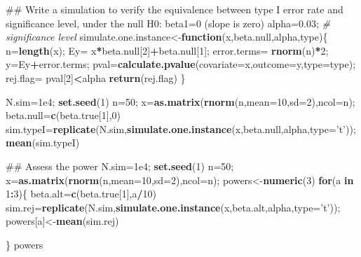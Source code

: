 \documentclass[12pt,]{book}
\newenvironment{Shaded}{\begin{snugshade}}{\end{snugshade}}
\newcommand{\KeywordTok}[1]{\textcolor[rgb]{0.13,0.29,0.53}{\textbf{#1}}}
\newcommand{\DataTypeTok}[1]{\textcolor[rgb]{0.13,0.29,0.53}{#1}}
\newcommand{\DecValTok}[1]{\textcolor[rgb]{0.00,0.00,0.81}{#1}}
\newcommand{\FloatTok}[1]{\textcolor[rgb]{0.00,0.00,0.81}{#1}}
\newcommand{\StringTok}[1]{\textcolor[rgb]{0.31,0.60,0.02}{#1}}
\newcommand{\CommentTok}[1]{\textcolor[rgb]{0.56,0.35,0.01}{\textit{#1}}}
\newcommand{\ControlFlowTok}[1]{\textcolor[rgb]{0.13,0.29,0.53}{\textbf{#1}}}
\newcommand{\OperatorTok}[1]{\textcolor[rgb]{0.81,0.36,0.00}{\textbf{#1}}}
\newcommand{\NormalTok}[1]{#1}
\begin{document}
\begin{Shaded}
\begin{Highlighting}[]
\NormalTok{## Write a simulation to verify the equivalence between type I error rate and significance level, under the null H0: beta1=0 (slope is zero)}
\NormalTok{alpha=}\FloatTok{0.03}\NormalTok{; }\CommentTok{# significance level }
\NormalTok{simulate.one.instance<-}\ControlFlowTok{function}\NormalTok{(x,beta.null,alpha,type)\{}
\NormalTok{  n=}\KeywordTok{length}\NormalTok{(x);}
\NormalTok{  Ey=}\StringTok{ }\NormalTok{x}\OperatorTok{*}\NormalTok{beta.null[}\DecValTok{2}\NormalTok{]}\OperatorTok{+}\NormalTok{beta.null[}\DecValTok{1}\NormalTok{];}
\NormalTok{  error.terms=}\StringTok{ }\KeywordTok{rnorm}\NormalTok{(n)}\OperatorTok{*}\DecValTok{2}\NormalTok{;}
\NormalTok{  y=Ey}\OperatorTok{+}\NormalTok{error.terms;}
\NormalTok{  pval=}\KeywordTok{calculate.pvalue}\NormalTok{(}\DataTypeTok{covariate=}\NormalTok{x,}\DataTypeTok{outcome=}\NormalTok{y,}\DataTypeTok{type=}\NormalTok{type);}
\NormalTok{  rej.flag=}\StringTok{ }\NormalTok{pval[}\DecValTok{2}\NormalTok{]}\OperatorTok{<}\NormalTok{alpha}
  \KeywordTok{return}\NormalTok{(rej.flag)}
\NormalTok{\}}

\NormalTok{N.sim=}\FloatTok{1e4}\NormalTok{;}
\KeywordTok{set.seed}\NormalTok{(}\DecValTok{1}\NormalTok{)}
\NormalTok{n=}\DecValTok{50}\NormalTok{;}
\NormalTok{x=}\KeywordTok{as.matrix}\NormalTok{(}\KeywordTok{rnorm}\NormalTok{(n,}\DataTypeTok{mean=}\DecValTok{10}\NormalTok{,}\DataTypeTok{sd=}\DecValTok{2}\NormalTok{),}\DataTypeTok{ncol=}\NormalTok{n);}
\NormalTok{beta.null=}\KeywordTok{c}\NormalTok{(beta.true[}\DecValTok{1}\NormalTok{],}\DecValTok{0}\NormalTok{)}
\NormalTok{sim.typeI=}\KeywordTok{replicate}\NormalTok{(N.sim,}\KeywordTok{simulate.one.instance}\NormalTok{(x,beta.null,alpha,}\DataTypeTok{type=}\StringTok{'t'}\NormalTok{));}
\KeywordTok{mean}\NormalTok{(sim.typeI)}
\end{Highlighting}
\end{Shaded}

\begin{Shaded}
\begin{Highlighting}[]
\NormalTok{## Assess the power }
\NormalTok{N.sim=}\FloatTok{1e4}\NormalTok{;}
\KeywordTok{set.seed}\NormalTok{(}\DecValTok{1}\NormalTok{)}
\NormalTok{n=}\DecValTok{50}\NormalTok{;}
\NormalTok{x=}\KeywordTok{as.matrix}\NormalTok{(}\KeywordTok{rnorm}\NormalTok{(n,}\DataTypeTok{mean=}\DecValTok{10}\NormalTok{,}\DataTypeTok{sd=}\DecValTok{2}\NormalTok{),}\DataTypeTok{ncol=}\NormalTok{n);}
\NormalTok{powers<-}\KeywordTok{numeric}\NormalTok{(}\DecValTok{3}\NormalTok{)}
\ControlFlowTok{for}\NormalTok{(a }\ControlFlowTok{in} \DecValTok{1}\OperatorTok{:}\DecValTok{3}\NormalTok{)\{}
\NormalTok{  beta.alt=}\KeywordTok{c}\NormalTok{(beta.true[}\DecValTok{1}\NormalTok{],a}\OperatorTok{/}\DecValTok{10}\NormalTok{)}
\NormalTok{  sim.rej=}\KeywordTok{replicate}\NormalTok{(N.sim,}\KeywordTok{simulate.one.instance}\NormalTok{(x,beta.alt,alpha,}\DataTypeTok{type=}\StringTok{'t'}\NormalTok{));}
\NormalTok{  powers[a]<-}\KeywordTok{mean}\NormalTok{(sim.rej)}
  
\NormalTok{\}}
\NormalTok{powers}
\end{Highlighting}
\end{Shaded}
\end{document}

